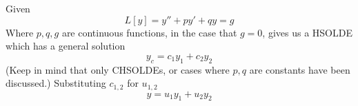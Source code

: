 \documentclass[twoside]{report}
\begin{document}
    \begin{bproof}
        Given
        \begin{equation}
            L[y] = y'' + py' + qy = g
        \end{equation}
        Where $p,q,g$ are continuous functions, in the case that $g = 0$, gives us a HSOLDE which has a general solution
        \begin{equation}
            y_{c} = c_{1}y_{1} + c_{2}y_{2}
        \end{equation}
        (Keep in mind that only CHSOLDEs, or cases where $p, q$ are constants have been discussed.)
        Substituting $c_{1,2}$ for $u_{1,2}$
        \begin{equation}
            y = u_{1}y_{1} + u_{2}y_{2}
        \end{equation}
    \end{bproof}
\end{document}
